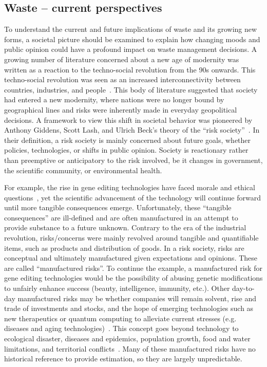 \documentclass[../main/main]{subfiles}
\begin{document}
\subsection{Waste -- current perspectives}
To understand the current and future implications of waste and its growing new forms, a societal picture should be examined to explain how changing moods and public opinion could have a profound impact on waste management decisions. A growing number of literature concerned about a new age of modernity was written as a reaction to the techno-social revolution from the 90s onwards. This techno-social revolution was seen as an increased interconnectivity between countries, industries, and people~\cite{ekberg2007}. This body of literature suggested that society had entered a new modernity, where nations were no longer bound by geographical lines and risks were inherently made in everyday geopolitical decisions. A framework to view this shift in societal behavior was pioneered by Anthony Giddens, Scott Lash, and Ulrich Beck's theory of the ``risk society''~\cite{elliott2013,giddens1991,beck1992}. In their definition, a risk society is mainly concerned about future goals, whether policies, technologies, or shifts in public opinion. Society is reactionary rather than preemptive or anticipatory to the risk involved, be it changes in government, the scientific community, or environmental health.

For example, the rise in gene editing technologies have faced morale and ethical questions~\cite{wang2019}, yet the scientific advancement of the technology will continue forward until more tangible consequences emerge. Unfortunately, these ``tangible consequences'' are ill-defined and are often manufactured in an attempt to provide substance to a future unknown. Contrary to the era of the industrial revolution, risks/concerns were mainly revolved around tangible and quantifiable items, such as products and distribution of goods. In a risk society, risks are conceptual and ultimately manufactured given expectations and opinions. These are called ``manufactured risks''. To continue the example, a manufactured risk for gene editing technologies would be the possibility of abusing genetic modifications to unfairly enhance success (beauty, intelligence, immunity, etc.). Other day-to-day manufactured risks may be whether companies will remain solvent, rise and trade of investments and stocks, and the hope of emerging technologies such as new therapeutics or quantum computing to alleviate current stresses (e.g. diseases and aging technologies)~\cite{beck1994,beck2006}.
This concept goes beyond technology to ecological disaster, diseases and epidemics, population growth, food and water limitations, and territorial conflicts~\cite{beck1994,elliott2013}. Many of these manufactured risks have no historical reference to provide estimation, so they are largely unpredictable.
\end{document}
